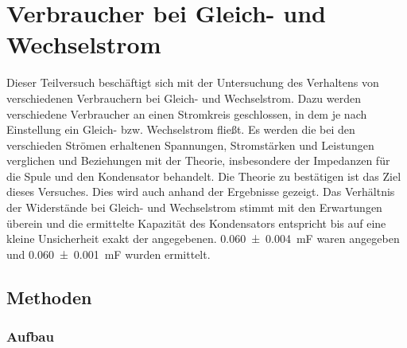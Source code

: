 \section{Verbraucher bei Gleich- und Wechselstrom} 

Dieser Teilversuch beschäftigt sich mit der Untersuchung des Verhaltens von verschiedenen Verbrauchern bei Gleich- und Wechselstrom.
Dazu werden verschiedene Verbraucher an einen Stromkreis geschlossen, in dem je nach Einstellung ein Gleich- bzw. Wechselstrom fließt.
Es werden die bei den verschieden Strömen erhaltenen Spannungen, Stromstärken und Leistungen verglichen und Beziehungen mit der Theorie, insbesondere der Impedanzen für die Spule und den Kondensator behandelt. 
Die Theorie zu bestätigen ist das Ziel dieses Versuches.
Dies wird auch anhand der Ergebnisse gezeigt.
Das Verhältnis der Widerstände bei Gleich- und Wechselstrom stimmt mit den Erwartungen überein und die ermittelte Kapazität des Kondensators entspricht bis auf eine kleine Unsicherheit exakt der angegebenen. \SI{0,060+-0,004}{\milli\farad} waren angegeben und \SI{0,060+-0,001}{\milli\farad} wurden ermittelt. 

\subsection{Methoden}

\subsubsection{Aufbau}

